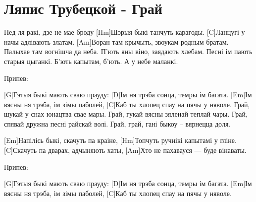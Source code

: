 \section{Ляпис Трубецкой - Грай}
\begin{guitar}
[Em]Нед ля ракі, дзе не мае броду
[Hm]Шэрыя быкі танчуть карагоды.
[C]Ланцугі у начы адлівають златам.
[Am]Воран там крычыть, звоукам родным братам.
Палыхае там вогнішча да неба.
П’ють яны віно, заядають хлебам.
Песні ім пають старыя цыганкі.
Б’ють капытам, б’ють.
А у небе маланкі.

Припев:

[G]Гэтыя быкі мають сваю прауду:
[D]Ім ня трэба сонца, темры ім багата.
[Em]Ім вясны ня трэба, ім зімы паболей,
[C]Каб ты хлопец спау на пячы у няволе.
Грай, шукай у снах юнацтва свае мары.
Грай, гукай вясны зяленай теплай чары.
Грай, спявай дружна песні райскай волі.
Грай, грай, гані быкоу – вярнецца доля.

[Em]Напілісь быкі, скачуть па краіне,
[Hm]Топчуть ручнікі капытамі у гліне.
[C]Скачуть па дварах, адчыняють хаты,
[Am]Хто не пахавауся — буде вінаваты.

Припев:

[G]Гэтыя быкі мають сваю прауду:
[D]Ім ня трэба сонца, темры ім багата.
[Em]Ім вясны ня трэба, ім зімы паболей,
[C]Каб ты хлопец спау на пячы у няволе.

\end{guitar}